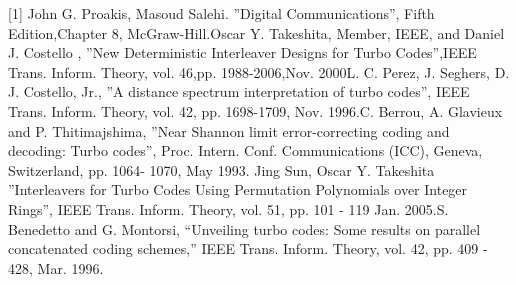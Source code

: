 \documentclass[technicalreport]{ieicej}
\begin{document}
[1] John G. Proakis, Masoud Salehi. ''Digital Communications'', 
Fifth Edition,Chapter 8, McGraw-Hill.\newline
[2] Oscar Y. Takeshita, Member, IEEE, and Daniel J. Costello ,
''New Deterministic Interleaver Designs for Turbo Codes'',IEEE Trans. Inform. 
Theory, vol.  46,pp. 1988-2006,Nov. 2000\newline
[3]  L. C. Perez, J. Seghers, D. J. Costello, Jr.,
 ''A distance spectrum interpretation of turbo codes'', IEEE Trans. Inform. Theory, 
 vol. 42, pp. 1698-1709, Nov. 1996.\newline
[4]  C. Berrou, A. Glavieux and P. Thitimajshima, 
''Near Shannon limit error-correcting coding and
decoding: Turbo codes'', Proc. Intern. Conf. Communications (ICC), Geneva, 
Switzerland, pp. 1064-
1070, May 1993. \newline
[5] Jing Sun, Oscar Y. Takeshita ''Interleavers for Turbo Codes Using 
Permutation Polynomials over Integer Rings'', IEEE Trans. Inform. Theory, vol. 51, 
pp. 101 - 119  Jan. 2005.\newline
[6] S. Benedetto and G. Montorsi, “Unveiling turbo codes: Some results
on parallel concatenated coding schemes,” IEEE Trans. Inform. Theory,
vol. 42, pp. 409 - 428, Mar. 1996.
\end{document}
